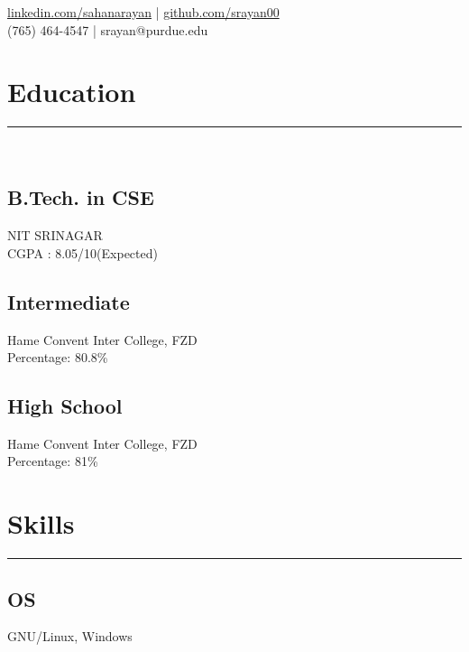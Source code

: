 \documentclass[]{sahana}
\begin{document}
{\href{https://www.linkedin.com/in/sahanarayan}{linkedin.com/sahanarayan} |
 \href{https://github.com/srayan00}{github.com/srayan00}\\
(765) 464-4547 | srayan@purdue.edu}
%
%
\begin{minipage}[t]{0.33\textwidth}

\section{Education} 
\noindent\rule{5cm}{0.4pt}\\
\subsection{B.Tech. in CSE}
NIT SRINAGAR \\
CGPA : 8.05/10(Expected)\\
\vspace{8pt}
\subsection{Intermediate}
Hame Convent Inter College, FZD\\
Percentage: 80.8\%\\
\vspace{8pt}
\subsection{High School}
Hame Convent Inter College, FZD\\
Percentage: 81\%
\sectionsep

\section{Skills}
\noindent\rule{5cm}{0.4pt}
\subsection{OS}
GNU/Linux, Windows
\vspace{6pt}

\end{minipage}
\end{document}

